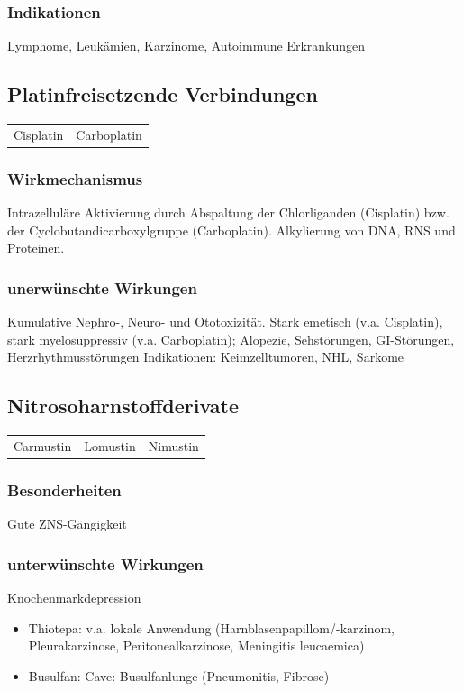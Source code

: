 \documentclass[10pt,a4paper]{report}
\begin{document}
\subsubsection{Indikationen} %
\label{par:indikationen}
Lymphome, Leukämien, Karzinome, Autoimmune Erkrankungen
\subsection{Platinfreisetzende Verbindungen} %
\label{sub:subsection_name}
\begin{tabularx}{\textwidth}{XX}
Cisplatin&Carboplatin \\ 
\end{tabularx}
\subsubsection{Wirkmechanismus} %
\label{ssub:wirkmechanismus}
Intrazelluläre Aktivierung durch Abspaltung der Chlorliganden (Cisplatin) bzw. der Cyclobutandicarboxylgruppe (Carboplatin). Alkylierung von DNA, RNS und Proteinen.
\subsubsection{unerwünschte Wirkungen} %
\label{ssub:unerw_nschte_wirkungen}
Kumulative Nephro-, Neuro- und Ototoxizität. Stark emetisch (v.a. Cisplatin), stark myelosuppressiv (v.a. Carboplatin); Alopezie, Sehstörungen, GI-Störungen, Herzrhythmusstörungen
Indikationen: Keimzelltumoren, NHL, Sarkome 
\subsection{Nitrosoharnstoffderivate} %
\label{sub:nitrosoharnstoffderivate}
\begin{tabularx}{\textwidth}{XXX}
Carmustin&Lomustin&Nimustin\\ 
\end{tabularx}
\subsubsection{Besonderheiten} %
\label{ssub:besonderheiten}
Gute ZNS-Gängigkeit
\subsubsection{unterwünschte Wirkungen} %
\label{ssub:unterw_nschte_wirkungen}
Knochenmarkdepression
\begin{itemize}
	\item  Thiotepa: v.a. lokale Anwendung (Harnblasenpapillom/-karzinom, Pleurakarzinose, Peritonealkarzinose, Meningitis leucaemica) 
	\item Busulfan: Cave: Busulfanlunge (Pneumonitis, Fibrose)
\end{itemize}
\end{document}
